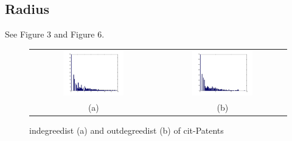 \subsection{Radius}
See Figure 3 and Figure 6.\\

\begin{figure}[htbf]
\begin{center}
\begin{tabular}{cc}
     \includegraphics[width=0.5\textwidth]{FIG/cit_result/indegreedist.png} &
     \includegraphics[width=0.5\textwidth]{FIG/cit_result/outdegreedist.png} \\
    (a) & (b) 
\end{tabular}
\caption{ indegreedist (a) and outdegreedist (b) of cit-Patents}
\label{fig:results}
\end{center}
\end{figure}

